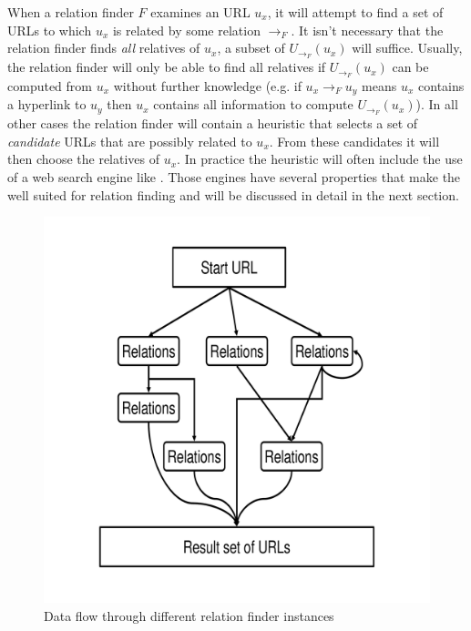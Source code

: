 \documentclass[a4paper]{danarticle}
\theoremstyle{remark}
\begin{document}
       When a relation finder $ F $ examines an URL $ u_x $, it will attempt to 
       find a set of URLs to which $ u_x $ is related by some relation 
       $ \rightarrow_F $. It isn't necessary that the relation finder finds 
       \emph{all} relatives of $ u_x $, a subset of $ U_{\rightarrow_F}(u_x) $ 
       will suffice. Usually, the relation finder will only be able to find 
       all relatives if $ U_{\rightarrow_F}(u_x) $ can be computed from $ u_x $ 
       without further knowledge (e.g. if $ u_x \rightarrow_F u_y $ means 
       $ u_x $ contains a hyperlink to $ u_y $ then $ u_x $ contains all 
       information to compute $ U_{\rightarrow_F}(u_x) $). In all other cases the 
       relation finder will contain a heuristic that selects a set of 
       \textit{candidate} URLs that are possibly related to $ u_x $. From these 
       candidates it will then choose the relatives of $ u_x $. In practice the 
       heuristic will often include the use of a web search engine like 
       \cite{google}. Those engines have several properties that make the well 
       suited for relation finding and will be discussed in detail in the next 
       section.
       
       \begin{figure}[ht]
         \centering
	     \includegraphics[width=12cm]{relations}
	     \caption{Data flow through different relation finder instances}
	     \label{relations}
       \end{figure}
       
\end{document}

